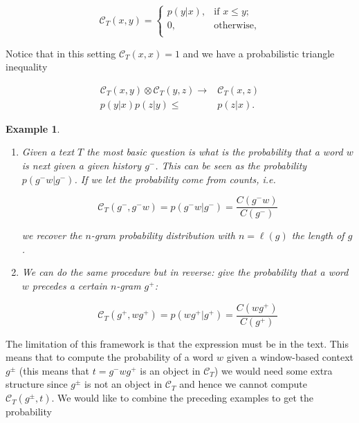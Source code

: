 \documentclass[10pt,a4paper]{elsarticle}
\newcommand{\C}{\mathcal{C}}
\newtheorem{exa}[theorem]{Example}
\begin{document}
\begin{equation}\label{eq:def}
	\C_{T}(x,y)=\left\{\begin{matrix}
		p(y|x),&\text{if $x\leq y$;}  \\
		0,& \text{otherwise,}  \\
	\end{matrix}\right.
\end{equation}

Notice that in this setting $\C_{T}(x,x)=1$ and we have a probabilistic triangle inequality

\begin{align*}
	\C_{T}(x,y)\otimes\C_{T}(y,z)\to&\C_{T}(x,z)\\
	p(y|x)p(z|y)\leq& p(z|x).
\end{align*}

\begin{exa}\label{exa:probs}
	\begin{enumerate}
		\item Given a text $T$ the most basic question is what is the probability that a word $w$ is next given a given history $g^{-}$. This can be seen as the probability $p(g^{-}w|g^{-})$. If we let the probability come from counts, i.e.
		
		\begin{equation}
			\C_{T}(g^{-},g^{-}w)=p(g^{-}w|g^{-})=\frac{C(g^{-}w)}{C(g^{-})}
		\end{equation}
		
		we recover the $n$-gram probability distribution with $n=\ell(g)$ the length of $g$.
		
		\item We can do the same procedure but in reverse: give the probability that a word $w$ precedes a certain $n$-gram $g^{+}$:
		
		\begin{equation}
			\C_{T}(g^{+},wg^{+})=p(wg^{+}|g^{+})=\frac{C(wg^{+})}{C(g^{+})}
		\end{equation}
	\end{enumerate}
\end{exa}
The limitation of this framework is that the expression must be in the text. This means that to compute the probability of a word $w$ given a window-based context $g^{\pm}$ (this means that $t=g^{-}wg^{+}$ is an object in $\C_{T}$) we would need some extra structure since $g^{\pm}$ is not an object in $\C_{T}$ and hence we cannot compute $\C_{T}(g^{\pm},t)$.
We would like to combine the preceding examples to get the probability
\end{document}
